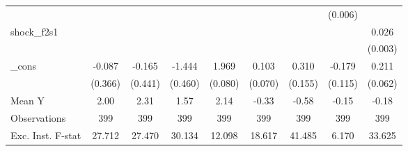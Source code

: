 {\begin{tabular}{l*{8}{c}}
            &                     &                     &                     &                     &                     &                     &     (0.006)         &                     \\
\addlinespace
shock\_f2s1  &                     &                     &                     &                     &                     &                     &                     &       0.026\sym{***}\\
            &                     &                     &                     &                     &                     &                     &                     &     (0.003)         \\
\addlinespace
\_cons      &      -0.087         &      -0.165         &      -1.444\sym{***}&       1.969\sym{***}&       0.103         &       0.310\sym{*}  &      -0.179         &       0.211\sym{***}\\
            &     (0.366)         &     (0.441)         &     (0.460)         &     (0.080)         &     (0.070)         &     (0.155)         &     (0.115)         &     (0.062)         \\
\midrule
Mean Y      &        2.00         &        2.31         &        1.57         &        2.14         &       -0.33         &       -0.58         &       -0.15         &       -0.18         \\
Observations&         399         &         399         &         399         &         399         &         399         &         399         &         399         &         399         \\
Exc. Inst. F-stat&      27.712         &      27.470         &      30.134         &      12.098         &      18.617         &      41.485         &       6.170         &      33.625         \\
\bottomrule
\end{tabular}
}
